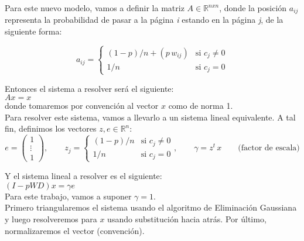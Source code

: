 Para este nuevo modelo, vamos a definir la matriz $A \in \mathbb{R}^{nxn}$, donde la posición $a_{ij}$ representa la probabilidad de pasar a la página \textit{i} estando en la página \textit{j}, de la siguiente forma:

\[ a_{ij} =
	\begin{cases}
		(1-p)/n + (p \, w_{ij}) 	& \text{si } c_{j}  \neq 0 \\
		1/n 				& \text{si } c_{j}   =   0
	\end{cases}
\]

Entonces el sistema a resolver será el siguiente: \\

$Ax = x$ \\

donde tomaremos por convención al vector $x$ como de norma 1. \\

Para resolver este sistema, vamos a llevarlo a un sistema lineal equivalente. A tal fin, definimos los vectores $z,e \in \mathbb{R}^{n}$: \\



\[
	e 	= \begin{pmatrix}
			1 \\
			\vdots \\
			1
		\end  {pmatrix}, 
\qquad
	z_{j} 	= \begin{cases}
			(1-p)/n & \text{si } c_{j} \neq 0 \\
			 1   /n & \text{si } c_{j}   =	0
		\end  {cases},
\qquad
	\gamma	= z^t \, x \qquad \text{(factor de escala)}
\]

Y el sistema lineal a resolver es el siguiente: \\

$(I - p W D) x = \gamma e$ \\

Para este trabajo, vamos a suponer $\gamma = 1$. \\

Primero triangularemos el sistema usando el algoritmo de Eliminación Gaussiana y luego resolveremos para $x$ usando substitución hacia atrás. Por último, normalizaremos el vector (convención).

